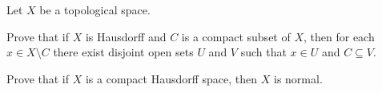 \item \label{ex:Compact_normal} Let $X$ be a topological space.

\ba

\item Prove that if $X$ is Hausdorff and $C$ is a compact subset of $X$, then for each $x \in X \setminus C$ there exist disjoint open sets $U$ and $V$ such that $x \in U$ and $C \subseteq V$. 

\item Prove that if $X$ is a compact Hausdorff space, then $X$ is normal.

\ea

\begin{comment}

\ExerciseSolution 

\ba

\item Assume that $X$ is Hausdorff and let $C$ be a compact subset of $X$. Let $x \in X \setminus C$. As a compact subset of a Hausdorff space, $C$ is closed. So $X \setminus C$ is open. Let $y \in C$. Then there exist disjoint open sets $U_y$ and $V_y$ such that $x \in U_y$ and $y \in V_y$. So $\{V_y\}_{y \in C}$ is an open cover of $C$. Since $C$ is compact, there exist $y_1$, $y_2$, $\ldots$, $y_n$ in $Y$ such that $\{V_{y_i}\}_{1 \leq i \leq n}$ is a finite subcover of $\{V_y\}_{y \in C}$. Let $V = \bigcup_{1 \leq i \leq n} V_{y_i}$ and let $U = \bigcap_{1 \leq i \leq n} U_{y_i}$. Since $U \cap V_{y_i} \subseteq U_{y_i} \cap V_{y_i} = \emptyset$ for each $i$, it follows that $U \cap V = \emptyset$. Also, $x \in U_{y_i}$ for each $i$ implies that $x \in U$. So $U$ and $V$ are the desired sets.  

\item Let $X$ be a compact Hausdorff space, and let $C$ and $D$ be closed subsets of $X$. Every closed subset of a compact space is compact, so both $C$ and $D$ are compact. For each $x \in C$, part (a) provides disjoint open sets $U_x$ and $V_x$ such that $x \in U_x$ and $D \subseteq V_x$. Thus, $C \subseteq \bigcup_{x \in C} U_x$. Since $C$ is compact, there exist $x_1$, $x_2$, $\ldots$, $x_n$ in $C$ such that $C \subseteq \bigcup_{1 \leq i \leq n} U_{x_i}$. Let $U = \bigcup_{1 \leq i \leq n} U_{x_i}$ and $V = \bigcap_{1 \leq i \leq n} V_{x_i}$. Since $D \subseteq V_{x_i}$ for each $i$, $D \subseteq V$. The fact that $U \cap V_{x_i} \subseteq U_{x_i} \cap V_{x_i} = \emptyset$ for each $i$ implies that $U \cap V = \emptyset$. Thus, the open sets $U$ and $V$ separate the closed sets $C$ and $D$. We conclude that $X$ is normal. 

\ea

\end{comment}


